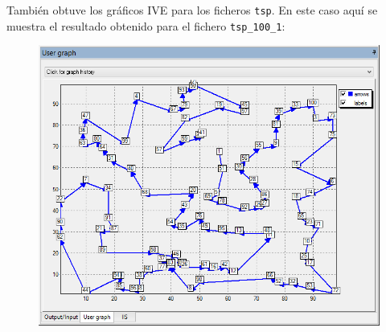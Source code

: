 \documentclass[a4paper,11pt]{article}
\begin{document}
También obtuve los gráficos IVE para los ficheros \texttt{tsp}. En este caso aquí se muestra el resultado obtenido para el fichero \texttt{tsp\_100\_1}:

\begin{figure}[!htbp]
	\centering
	\includegraphics[width=1.0\textwidth]{2opt_100_1.png}
\end{figure}
\end{document}
